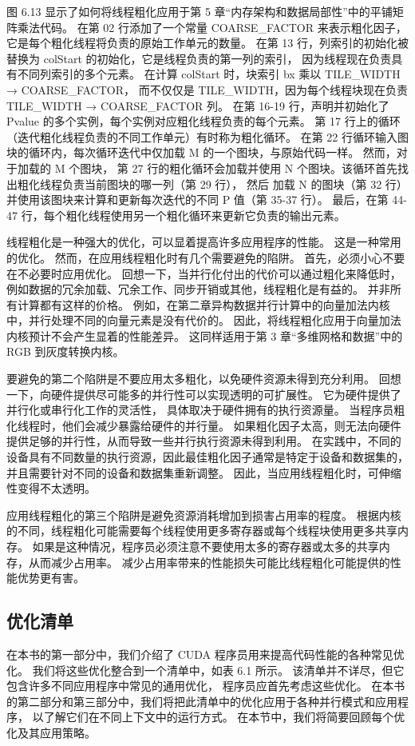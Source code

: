 图 6.13 显示了如何将线程粗化应用于第 5 章“内存架构和数据局部性”中的平铺矩阵乘法代码。 
在第 02 行添加了一个常量 COARSE\_FACTOR 来表示粗化因子，它是每个粗化线程将负责的原始工作单元的数量。 
在第 13 行，列索引的初始化被替换为 colStart 的初始化，它是线程负责的第一列的索引，
因为线程现在负责具有不同列索引的多个元素。 在计算 colStart 时，块索引 bx 乘以 TILE\_WIDTH → COARSE\_FACTOR，
而不仅仅是 TILE\_WIDTH，因为每个线程块现在负责 TILE\_WIDTH → COARSE\_FACTOR 列。 
在第 16-19 行，声明并初始化了 Pvalue 的多个实例，每个实例对应粗化线程负责的每个元素。 
第 17 行上的循环（迭代粗化线程负责的不同工作单元）有时称为粗化循环。 
在第 22 行循环输入图块的循环内，每次循环迭代中仅加载 M 的一个图块，与原始代码一样。 然而，对于加载的 M 个图块，
第 27 行的粗化循环会加载并使用 N 个图块。该循环首先找出粗化线程负责当前图块的哪一列（第 29 行），
然后 加载 N 的图块（第 32 行）并使用该图块来计算和更新每次迭代的不同 P 值（第 35-37 行）。 
最后，在第 44-47 行，每个粗化线程使用另一个粗化循环来更新它负责的输出元素。

线程粗化是一种强大的优化，可以显着提高许多应用程序的性能。 这是一种常用的优化。 
然而，在应用线程粗化时有几个需要避免的陷阱。 首先，必须小心不要在不必要时应用优化。 
回想一下，当并行化付出的代价可以通过粗化来降低时，例如数据的冗余加载、冗余工作、同步开销或其他，线程粗化是有益的。 
并非所有计算都有这样的价格。 例如，在第二章异构数据并行计算中的向量加法内核中，并行处理不同的向量元素是没有代价的。 
因此，将线程粗化应用于向量加法内核预计不会产生显着的性能差异。 
这同样适用于第 3 章“多维网格和数据”中的 RGB 到灰度转换内核。

要避免的第二个陷阱是不要应用太多粗化，以免硬件资源未得到充分利用。 
回想一下，向硬件提供尽可能多的并行性可以实现透明的可扩展性。 它为硬件提供了并行化或串行化工作的灵活性，
具体取决于硬件拥有的执行资源量。 当程序员粗化线程时，他们会减少暴露给硬件的并行量。 
如果粗化因子太高，则无法向硬件提供足够的并行性，从而导致一些并行执行资源未得到利用。 
在实践中，不同的设备具有不同数量的执行资源，因此最佳粗化因子通常是特定于设备和数据集的，
并且需要针对不同的设备和数据集重新调整。 因此，当应用线程粗化时，可伸缩性变得不太透明。

应用线程粗化的第三个陷阱是避免资源消耗增加到损害占用率的程度。 
根据内核的不同，线程粗化可能需要每个线程使用更多寄存器或每个线程块使用更多共享内存。 
如果是这种情况，程序员必须注意不要使用太多的寄存器或太多的共享内存，从而减少占用率。 
减少占用率带来的性能损失可能比线程粗化可能提供的性能优势更有害。

\subsection{优化清单}
在本书的第一部分中，我们介绍了 CUDA 程序员用来提高代码性能的各种常见优化。 
我们将这些优化整合到一个清单中，如表 6.1 所示。 该清单并不详尽，但它包含许多不同应用程序中常见的通用优化，
程序员应首先考虑这些优化。 在本书的第二部分和第三部分中，我们将把此清单中的优化应用于各种并行模式和应用程序，
以了解它们在不同上下文中的运行方式。 在本节中，我们将简要回顾每个优化及其应用策略。

